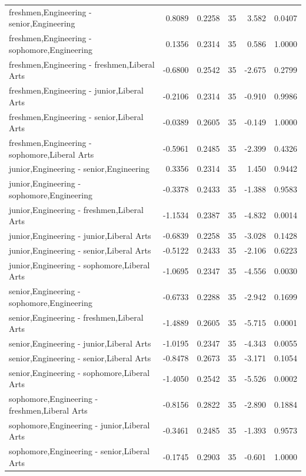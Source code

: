 \documentclass{article} %
\begin{document}
\begin{table}[H]
\begin{tabular}{|l|r|r|r|r|l|}
		freshmen,Engineering - senior,Engineering & 0.8089 & 0.2258 & 35 & 3.582 & 0.0407 \\ 
		freshmen,Engineering - sophomore,Engineering & 0.1356 & 0.2314 & 35 & 0.586 & 1.0000 \\ 
		freshmen,Engineering - freshmen,Liberal Arts & -0.6800 & 0.2542 & 35 & -2.675 & 0.2799 \\ 
		freshmen,Engineering - junior,Liberal Arts & -0.2106 & 0.2314 & 35 & -0.910 & 0.9986 \\ 
		freshmen,Engineering - senior,Liberal Arts & -0.0389 & 0.2605 & 35 & -0.149 & 1.0000 \\ 
		freshmen,Engineering - sophomore,Liberal Arts & -0.5961 & 0.2485 & 35 & -2.399 & 0.4326 \\ 
		junior,Engineering - senior,Engineering & 0.3356 & 0.2314 & 35 & 1.450 & 0.9442 \\ 
		junior,Engineering - sophomore,Engineering & -0.3378 & 0.2433 & 35 & -1.388 & 0.9583 \\ 
		junior,Engineering - freshmen,Liberal Arts & -1.1534 & 0.2387 & 35 & -4.832 & 0.0014 \\ 
		junior,Engineering - junior,Liberal Arts & -0.6839 & 0.2258 & 35 & -3.028 & 0.1428 \\ 
		junior,Engineering - senior,Liberal Arts & -0.5122 & 0.2433 & 35 & -2.106 & 0.6223 \\ 
		junior,Engineering - sophomore,Liberal Arts & -1.0695 & 0.2347 & 35 & -4.556 & 0.0030 \\ 
		senior,Engineering - sophomore,Engineering & -0.6733 & 0.2288 & 35 & -2.942 & 0.1699 \\ 
		senior,Engineering - freshmen,Liberal Arts & -1.4889 & 0.2605 & 35 & -5.715 & 0.0001 \\ 
		senior,Engineering - junior,Liberal Arts & -1.0195 & 0.2347 & 35 & -4.343 & 0.0055 \\ 
		senior,Engineering - senior,Liberal Arts & -0.8478 & 0.2673 & 35 & -3.171 & 0.1054 \\ 
		senior,Engineering - sophomore,Liberal Arts & -1.4050 & 0.2542 & 35 & -5.526 & 0.0002 \\ 
		sophomore,Engineering - freshmen,Liberal Arts & -0.8156 & 0.2822 & 35 & -2.890 & 0.1884 \\ 
		sophomore,Engineering - junior,Liberal Arts & -0.3461 & 0.2485 & 35 & -1.393 & 0.9573 \\ 
		sophomore,Engineering - senior,Liberal Arts & -0.1745 & 0.2903 & 35 & -0.601 & 1.0000 \\ 

\end{tabular}
\end{table}
\end{document}
